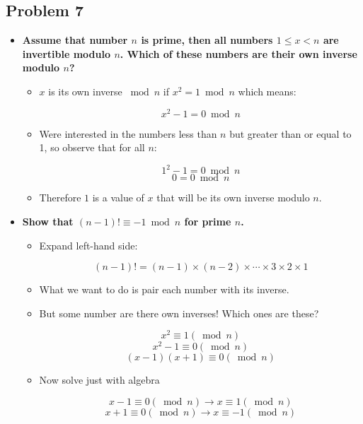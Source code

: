 \documentclass[11pt]{article}
\begin{document}
\subsection*{Problem 7}

\begin{itemize}

\item \textbf{Assume that number $n$ is prime, then all numbers $1 \leq x < n$
  are invertible modulo $n$. Which of these numbers are their own
  inverse modulo $n$?}
  
  \begin{itemize}
  
  	\item  $x$ is its own inverse $\bmod n$ if $x^2 = 1 \bmod n$ which means:
	
	$$x^2 -  1 =  0 \bmod n$$
	
	\item Were interested in the numbers less than $n$ but greater than or 
	equal to 1, so observe that for all $n$:
	
	$$1^2 - 1 = 0 \bmod n$$
	$$0 = 0 \bmod n$$
	
	\item Therefore $1$ is a value of $x$ that will be its own inverse modulo
	$n$.
	  
  \end{itemize}

\item \textbf{Show that $(n-1)! \equiv -1 \bmod n$ for prime $n$.}

\begin{itemize}

\item Expand left-hand side:

$$ (n-1)! = (n - 1) \times (n - 2) \times \cdots \times 3 \times 2 \times 1$$ 

\item What we want to do is pair each number with its inverse.

\item But some number are there own inverses! Which ones are these?

$$ x^2 \equiv 1 (\bmod n) $$
$$ x^2 - 1 \equiv 0 (\bmod n) $$
$$ (x - 1)(x + 1) \equiv 0 (\bmod n) $$

\item Now solve just with algebra

$$ x - 1 \equiv 0 (\bmod n) \to x \equiv 1 (\bmod n) $$
$$ x + 1 \equiv 0 (\bmod n) \to x \equiv -1 (\bmod n) $$


\end{itemize}
\end{itemize}
\end{document}
